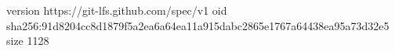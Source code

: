 version https://git-lfs.github.com/spec/v1
oid sha256:91d8204cc8d1879f5a2ea6a64ea11a915dabc2865e1767a64438ea95a73d32e5
size 1128
